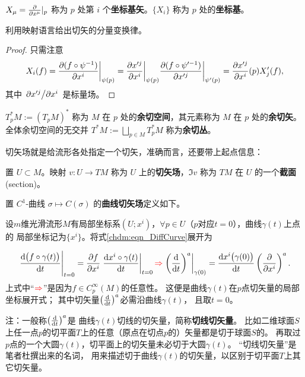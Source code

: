 \begin{definition}
    $X_\mu = \pdv{x^\mu}|_p$ 称为 $p$ 处第 $i$ 个\textbf{坐标基矢}。$\{X_i\}$ 称为 $p$ 处的\textbf{坐标基}。
\end{definition}

\begin{theorem}
    利用映射语言给出切矢的分量变换律。
\end{theorem}
\begin{proof}只需注意
    \[
    X_i(f)=\pdv{(f\circ\psi^{-1})}{x^i}\bigg|_{\psi(p)}=\pdv{x'^j}{x^i}\bigg|_{\psi(p)}\pdv{(f\circ\psi'^{-1})}{x'^j}\bigg|_{\psi'(p)}={\pdv{x'^j}{x^i}}(p)X'_j(f),
    \]
其中 $\pdv*{x'^j}{x^i}$ 是标量场。
\end{proof}

\begin{definition}
    $T^*_p M:=(T_p M)^*$ 称为 $M$ 在 $p$ 处的\textbf{余切空间}，其元素称为 $M$ 在 $p$ 处的\textbf{余切矢}。
    全体余切空间的无交并 $T^*M:=\bigsqcup_{p\in M} T^*_p M$ 称为\textbf{余切丛}。
\end{definition}



切矢场就是给流形各处指定一个切矢，准确而言，还要带上起点信息：
\begin{definition}
    置 $U\subset M$。映射 $v:U\to TM$ 称为 $U$  上的\textbf{切矢场}，$\Im v$ 称为 $TM$ 在 $U$ 的一个\textbf{截面}(section)。
\end{definition}

\begin{definition}
    置 $C^1$-曲线 $\sigma\mapsto C(\sigma)$ 的\textbf{曲线切矢场}定义如下。


    设$m$维光滑流形$M$有局部坐标系$(U;x^i)$，$\forall p\in U$（$p$对应$t=0$），曲线$\gamma(t)$上点的
    局部坐标记为$\{x^i\}$。将式\eqref{chdm:eqn_DiffCurve}展开为

    \begin{equation}\label{chdm:eqn_DiffCurve-2}
        \left. \frac{{\rm d} \bigl(f \circ \gamma (t)\bigr)}{{\rm d} t} \right |_{t=0}
        = \frac{\partial f}{\partial x^i}
        \left. \frac{{\rm d} x^i\circ\gamma (t)}{{\rm d} t} \right |_{t=0}
        {\color{red}\Rightarrow}
        \left. \left(\frac{{\rm d}  }{{\rm d} t}\right)^a \right |_{\gamma (0)}
        = \frac{{\rm d} x^i\bigl(\gamma (0)\bigr)}{{\rm d} t}
        \left(\frac{\partial }{\partial x^i}\right)^a .
    \end{equation}
    上式中“${\color{red}\Rightarrow}$”是因为$f \in C^\infty_p(M)$的任意性。
    这便是曲线$\gamma(t)$在$p$点切矢量的局部坐标展开式；
    其中切矢量$\left(\frac{{\rm d}  }{{\rm d} t}\right)^a $必需沿曲线$\gamma(t)$，
    且取$t=0$。
    
     
    
    注：一般称$\left(\frac{{\rm d}  }{{\rm d} t}\right)^a $是
    曲线$\gamma(t)$切线的切矢量，简称\textbf{切线切矢量}。 
    比如二维球面$S$上任一点$p$的切平面$T$上的任意（原点在切点$p$的）矢量都是切于球面$S$的。
    再取过$p$点的一个大圆$\gamma(t)$，切平面上的切矢量未必切于大圆$\gamma(t)$。
    “切线切矢量”是笔者杜撰出来的名词，
    用来描述切于曲线$\gamma(t)$的切矢量，以区别于切平面$T$上其它切矢量。
\end{definition}

